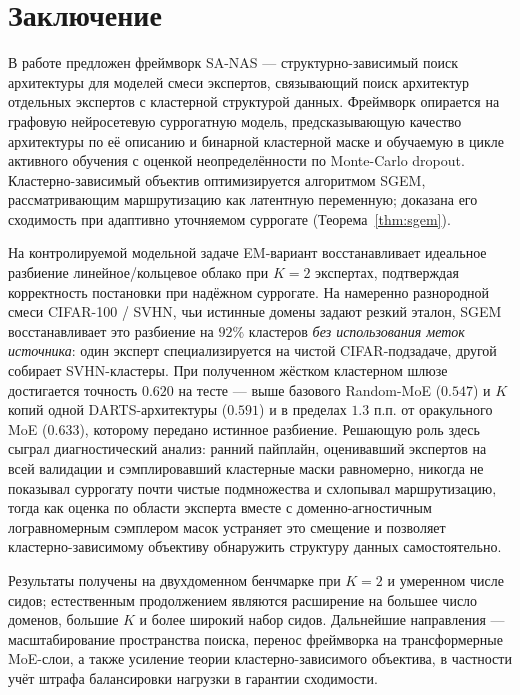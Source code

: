 \chapter*{Заключение}

В работе предложен фреймворк SA-NAS --- структурно-зависимый поиск
архитектуры для моделей смеси экспертов, связывающий поиск архитектур
отдельных экспертов с кластерной структурой данных. Фреймворк опирается
на графовую нейросетевую суррогатную модель, предсказывающую качество
архитектуры по её описанию и бинарной кластерной маске и обучаемую в
цикле активного обучения с оценкой неопределённости по Monte-Carlo
dropout. Кластерно-зависимый объектив оптимизируется алгоритмом SGEM,
рассматривающим маршрутизацию как латентную переменную; доказана его
сходимость при адаптивно уточняемом суррогате (Теорема~\ref{thm:sgem}).

На контролируемой модельной задаче EM-вариант восстанавливает идеальное
разбиение линейное/кольцевое облако при $K = 2$ экспертах, подтверждая
корректность постановки при надёжном суррогате. На намеренно разнородной
смеси CIFAR-100 / SVHN, чьи истинные домены задают резкий эталон, SGEM
восстанавливает это разбиение на $92\%$ кластеров \emph{без использования
меток источника}: один эксперт специализируется на чистой
CIFAR-подзадаче, другой собирает SVHN-кластеры. При полученном жёстком
кластерном шлюзе достигается точность $0.620$ на тесте --- выше базового
Random-MoE ($0.547$) и $K$ копий одной DARTS-архитектуры ($0.591$) и в
пределах $1.3$ п.п. от оракульного MoE ($0.633$), которому передано
истинное разбиение. Решающую роль здесь сыграл диагностический анализ:
ранний пайплайн, оценивавший экспертов на всей валидации и сэмплировавший
кластерные маски равномерно, никогда не показывал суррогату почти чистые
подмножества и схлопывал маршрутизацию, тогда как оценка по области
эксперта вместе с доменно-агностичным логравномерным сэмплером масок
устраняет это смещение и позволяет кластерно-зависимому объективу
обнаружить структуру данных самостоятельно.

Результаты получены на двухдоменном бенчмарке при $K = 2$ и умеренном
числе сидов; естественным продолжением являются расширение на большее
число доменов, большие $K$ и более широкий набор сидов. Дальнейшие
направления --- масштабирование пространства поиска, перенос фреймворка
на трансформерные MoE-слои, а также усиление теории кластерно-зависимого
объектива, в частности учёт штрафа балансировки нагрузки в гарантии
сходимости.
